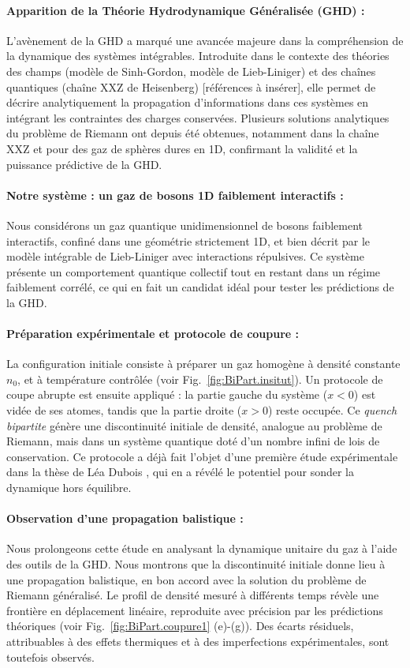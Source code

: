 \paragraph{Apparition de la Théorie Hydrodynamique Généralisée (GHD) :}
L’avènement de la GHD a marqué une avancée majeure dans la compréhension de la dynamique des systèmes intégrables. Introduite dans le contexte des théories des champs (modèle de Sinh-Gordon, modèle de Lieb-Liniger) et des chaînes quantiques (chaîne XXZ de Heisenberg) [références à insérer], elle permet de décrire analytiquement la propagation d’informations dans ces systèmes en intégrant les contraintes des charges conservées. Plusieurs solutions analytiques du problème de Riemann ont depuis été obtenues, notamment dans la chaîne XXZ et pour des gaz de sphères dures en 1D, confirmant la validité et la puissance prédictive de la GHD.

\paragraph{Notre système : un gaz de bosons 1D faiblement interactifs :}
Nous considérons un gaz quantique unidimensionnel de bosons faiblement interactifs, confiné dans une géométrie strictement 1D, et bien décrit par le modèle intégrable de Lieb-Liniger avec interactions répulsives. Ce système présente un comportement quantique collectif tout en restant dans un régime faiblement corrélé, ce qui en fait un candidat idéal pour tester les prédictions de la GHD.

\paragraph{Préparation expérimentale et protocole de coupure :}
La configuration initiale consiste à préparer un gaz homogène à densité constante $n_0$, et à température contrôlée (voir Fig.~\ref{fig:BiPart.insitut}). Un protocole de coupe abrupte est ensuite appliqué : la partie gauche du système ($x<0$) est vidée de ses atomes, tandis que la partie droite ($x>0$) reste occupée. Ce \emph{quench bipartite} génère une discontinuité initiale de densité, analogue au problème de Riemann, mais dans un système quantique doté d’un nombre infini de lois de conservation. Ce protocole a déjà fait l’objet d’une première étude expérimentale dans la thèse de Léa Dubois \cite{DuboisThese}, qui en a révélé le potentiel pour sonder la dynamique hors équilibre.

\paragraph{Observation d’une propagation balistique :}
Nous prolongeons cette étude en analysant la dynamique unitaire du gaz à l’aide des outils de la GHD. Nous montrons que la discontinuité initiale donne lieu à une propagation balistique, en bon accord avec la solution du problème de Riemann généralisé. Le profil de densité mesuré à différents temps révèle une frontière en déplacement linéaire, reproduite avec précision par les prédictions théoriques (voir Fig.~\ref{fig:BiPart.coupure1} (e)-(g)). Des écarts résiduels, attribuables à des effets thermiques et à des imperfections expérimentales, sont toutefois observés.

